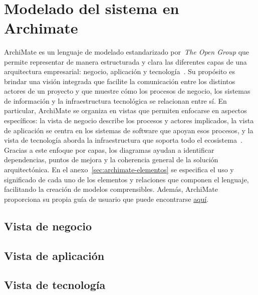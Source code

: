 \label{cap:disenio}
\mbox{}\\
\section{Modelado del sistema en Archimate}
\noindent
ArchiMate es un lenguaje de modelado estandarizado por~\textit{The Open Group} que permite representar de manera estructurada y clara las diferentes capas de una arquitectura empresarial: negocio, aplicación y tecnología~\citep{opengroup_archimate_overview}. Su propósito es brindar una visión integrada que facilite la comunicación entre los distintos actores de un proyecto y que muestre cómo los procesos de negocio, los sistemas de información y la infraestructura tecnológica se relacionan entre sí.
En particular, ArchiMate se organiza en vistas que permiten enfocarse en aspectos específicos: la vista de negocio describe los procesos y actores implicados, la vista de aplicación se centra en los sistemas de software que apoyan esos procesos, y la vista de tecnología aborda la infraestructura que soporta todo el ecosistema~\citep{archi_user_guide}. Gracias a este enfoque por capas, los diagramas ayudan a identificar dependencias, puntos de mejora y la coherencia general de la solución arquitectónica.
En el anexo~\ref{sec:archimate-elementos} se especifica el uso y significado de cada uno de los elementos y relaciones que componen el lenguaje, facilitando la creación de modelos comprensibles. Además, ArchiMate proporciona su propia guía de usuario que puede encontrarse \href{https://www.archimatetool.com/downloads/archi/Archi%20User%20Guide.pdf}{aquí}.

\subsection{Vista de negocio}
\noindent


\subsection{Vista de aplicación}
\noindent


\subsection{Vista de tecnología}
\noindent


